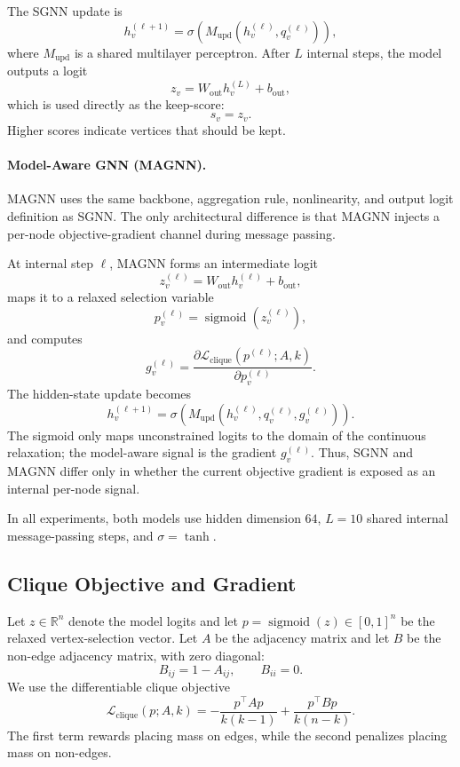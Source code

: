 The SGNN update is
\[
  h_v^{(\ell+1)}
  =
  \sigma\!\left(
    M_{\mathrm{upd}}\!\left(h_v^{(\ell)},q_v^{(\ell)}\right)
  \right),
\]
where $M_{\mathrm{upd}}$ is a shared multilayer perceptron. After $L$ internal steps, the model outputs a logit
\[
  z_v = W_{\mathrm{out}}h_v^{(L)} + b_{\mathrm{out}},
\]
which is used directly as the keep-score:
\[
  s_v=z_v .
\]
Higher scores indicate vertices that should be kept.

\paragraph{Model-Aware GNN (MAGNN).}
MAGNN uses the same backbone, aggregation rule, nonlinearity, and output logit definition as SGNN. The only architectural difference is that MAGNN injects a per-node objective-gradient channel during message passing.

At internal step $\ell$, MAGNN forms an intermediate logit
\[
  z_v^{(\ell)}
  =
  W_{\mathrm{out}}h_v^{(\ell)} + b_{\mathrm{out}},
\]
maps it to a relaxed selection variable
\[
  p_v^{(\ell)}
  =
  \operatorname{sigmoid}\!\left(z_v^{(\ell)}\right),
\]
and computes
\[
  g_v^{(\ell)}
  =
  \frac{\partial \mathcal{L}_{\mathrm{clique}}(p^{(\ell)};A,k)}
  {\partial p_v^{(\ell)}} .
\]
The hidden-state update becomes
\[
  h_v^{(\ell+1)}
  =
  \sigma\!\left(
    M_{\mathrm{upd}}\!\left(h_v^{(\ell)},q_v^{(\ell)},g_v^{(\ell)}\right)
  \right).
\]
The sigmoid only maps unconstrained logits to the domain of the continuous relaxation; the model-aware signal is the gradient $g_v^{(\ell)}$. Thus, SGNN and MAGNN differ only in whether the current objective gradient is exposed as an internal per-node signal.

In all experiments, both models use hidden dimension $64$, $L=10$ shared internal message-passing steps, and $\sigma=\tanh$.

\subsection{Clique Objective and Gradient}

Let $z\in\mathbb{R}^n$ denote the model logits and let
$
p=\operatorname{sigmoid}(z)\in[0,1]^n
$
be the relaxed vertex-selection vector. Let $A$ be the adjacency matrix and let $B$ be the non-edge adjacency matrix, with zero diagonal:
\[
  B_{ij}=1-A_{ij}, \qquad B_{ii}=0 .
\]
We use the differentiable clique objective
\[
  \mathcal{L}_{\mathrm{clique}}(p;A,k)
  =
  -\frac{p^\top A p}{k(k-1)}
  +\frac{p^\top B p}{k(n-k)} .
\]
The first term rewards placing mass on edges, while the second penalizes placing mass on non-edges.

